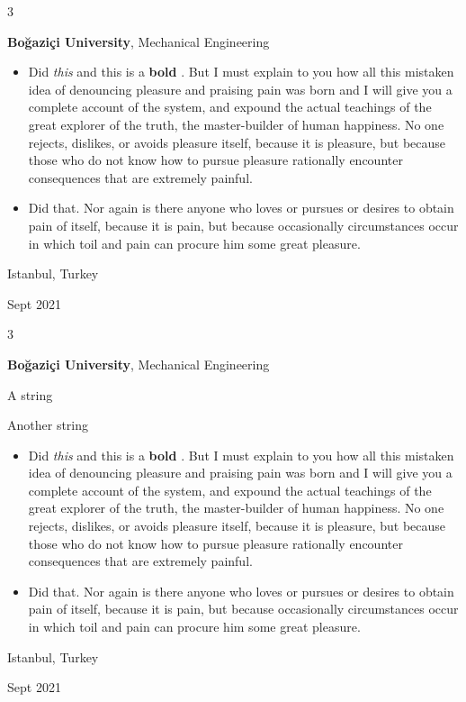 \documentclass[10pt, letterpaper]{article}
\newenvironment{summary}{
    \begin{description}[
        topsep=0.10 cm,
        parsep=0.10 cm,
        partopsep=0pt,
        itemsep=0pt,
        leftmargin=0.4 cm + 10pt
    ]
}{
    \end{description}
} %
\newenvironment{highlights}{
    \begin{itemize}[
        topsep=0.10 cm,
        parsep=0.10 cm,
        partopsep=0pt,
        itemsep=0pt,
        leftmargin=0.4 cm + 10pt
    ]
}{
    \end{itemize}
} %
\newenvironment{threecolentry}[3][]{
    \onecolentry
    \def\thirdColumn{#3}
    \setcolumnwidth{1 cm, \fill, 4.5 cm}
    \begin{paracol}{3}
    {\raggedright #2} \switchcolumn
}{
    \switchcolumn \raggedleft \thirdColumn
    \end{paracol}
    \endonecolentry
} %
\let\hrefWithoutArrow\href
\renewcommand{\href}[2]{\hrefWithoutArrow{#1}{\ifthenelse{\equal{#2}{}}{ }{#2 }\raisebox{.15ex}{\footnotesize \faExternalLink*}}}
\begin{document}
        \begin{threecolentry}{\textbf{}}{
            Istanbul, Turkey

        Sept 2021
        }
            \textbf{Boğaziçi University}, Mechanical Engineering
            \begin{highlights}
                \item Did \textit{this} and this is a \textbf{bold} \href{https://example.com}{link}. But I must explain to you how all this mistaken idea of denouncing pleasure and praising pain was born and I will give you a complete account of the system, and expound the actual teachings of the great explorer of the truth, the master-builder of human happiness. No one rejects, dislikes, or avoids pleasure itself, because it is pleasure, but because those who do not know how to pursue pleasure rationally encounter consequences that are extremely painful.
                \item Did that. Nor again is there anyone who loves or pursues or desires to obtain pain of itself, because it is pain, but because occasionally circumstances occur in which toil and pain can procure him some great pleasure.
            \end{highlights}
        \end{threecolentry}

        \vspace{0.2 cm}

        \begin{threecolentry}{\textbf{}}{
            Istanbul, Turkey

        Sept 2021
        }
            \textbf{Boğaziçi University}, Mechanical Engineering
            \begin{summary}
                \item A string
                \item Another string
            \end{summary}
            \begin{highlights}
                \item Did \textit{this} and this is a \textbf{bold} \href{https://example.com}{link}. But I must explain to you how all this mistaken idea of denouncing pleasure and praising pain was born and I will give you a complete account of the system, and expound the actual teachings of the great explorer of the truth, the master-builder of human happiness. No one rejects, dislikes, or avoids pleasure itself, because it is pleasure, but because those who do not know how to pursue pleasure rationally encounter consequences that are extremely painful.
                \item Did that. Nor again is there anyone who loves or pursues or desires to obtain pain of itself, because it is pain, but because occasionally circumstances occur in which toil and pain can procure him some great pleasure.
            \end{highlights}
        \end{threecolentry}
\end{document}
